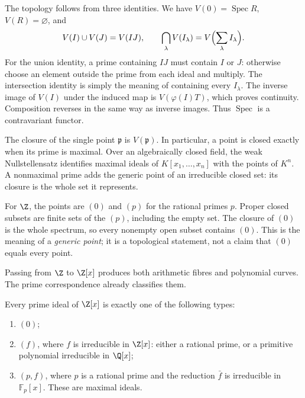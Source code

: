 The topology follows from three identities. We have $V(0)=\operatorname{Spec}R$, $V(R)=\varnothing$, and
\[
V(I)\cup V(J)=V(IJ),\qquad
\bigcap_\lambda V(I_\lambda)=V\Bigl(\sum_\lambda I_\lambda\Bigr).
\]
For the union identity, a prime containing $IJ$ must contain $I$ or $J$: otherwise choose an element outside the prime from each ideal and multiply. The intersection identity is simply the meaning of containing every $I_\lambda$. The inverse image of $V(I)$ under the induced map is $V(\varphi(I)T)$, which proves continuity. Composition reverses in the same way as inverse images. Thus $\operatorname{Spec}$ is a contravariant functor.

The closure of the single point $\mathfrak p$ is $V(\mathfrak p)$. In particular, a point is closed exactly when its prime is maximal. Over an algebraically closed field, the weak Nullstellensatz identifies maximal ideals of $K[x_1,\ldots,x_n]$ with the points of $K^n$. A nonmaximal prime adds the generic point of an irreducible closed set: its closure is the whole set it represents.

For $\Z$, the points are $(0)$ and $(p)$ for the rational primes $p$. Proper closed subsets are finite sets of the $(p)$, including the empty set. The closure of $(0)$ is the whole spectrum, so every nonempty open subset contains $(0)$. This is the meaning of a \emph{generic point}; it is a topological statement, not a claim that $(0)$ equals every point.

Passing from $\Z$ to $\Z[x]$ produces both arithmetic fibres and polynomial curves. The prime correspondence already classifies them.

\begin{theorem}\label{thm:speczx}
Every prime ideal of $\Z[x]$ is exactly one of the following types:
\begin{enumerate}[label=(\alph*)]
\item $(0)$;
\item $(f)$, where $f$ is irreducible in $\Z[x]$: either a rational prime, or a primitive polynomial irreducible in $\Q[x]$;
\item $(p,f)$, where $p$ is a rational prime and the reduction $\bar f$ is irreducible in $\mathbb F_p[x]$. These are maximal ideals.
\end{enumerate}
\end{theorem}

